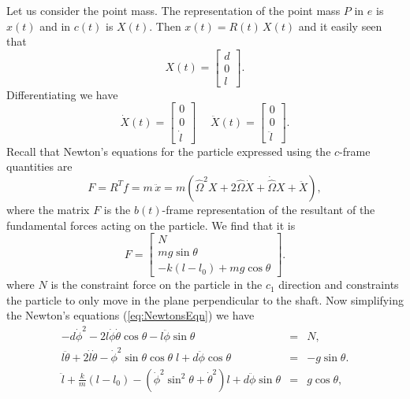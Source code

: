 \documentclass[graybox,envcountchap,sectrefs]{svmonoMuga}
\begin{document}
Let us consider the 
point mass.
The representation of the point mass $P$ in $e$ is $x(t)$ and in $c(t)$ is $X(t)$. Then $x(t)=R(t)\, X(t)$ and it easily seen that
\[
X(t)=\left[ \begin{array}{c}
d \\ 0 \\ l \end{array} \right].
\]
Differentiating we have
\[
\dot{X}(t)=\left[ \begin{array}{c}
0 \\
0 \\
\dot{l} \end{array} \right]\,\:\:\:\:\:
\ddot{X}(t)=\left[ \begin{array}{c}
0 \\
0 \\
\ddot{l} \end{array} \right].
\]
Recall that Newton's equations for the particle expressed using the $c$-frame quantities are
\begin{equation}\label{eq:NewtonsEqn}
F=R^T f=m\, \ddot{x}=m(\widehat{\Omega}^2X+2\widehat{\Omega}\dot{X}+\dot{\widehat{\Omega}}X+\ddot{X}),
\end{equation}
where the matrix $F$ is the $b(t)$-frame representation of the resultant of the fundamental forces acting on the particle. We find that it is
\[
F=\left[ \begin{array}{c}
N \\ mg\sin{\theta} \\ -k(l-l_0)+mg\cos{\theta}  \end{array} \right].
\]
where $N$ is the constraint force on the particle in the $c_1$ direction and constraints the particle to only move in the plane perpendicular to the shaft. Now simplifying the Newton's 
equations (\ref{eq:NewtonsEqn}) we have
\begin{eqnarray}
-d\dot{\phi}^2-2l\dot{\phi}\dot{\theta}\cos{\theta}-l\ddot{\phi}\sin{\theta}&=& N,\\
l\ddot{\theta} + 2 \dot{l}\dot{\theta}-\dot{\phi}^2\sin{\theta}\cos{\theta}\;l+ d\ddot{\phi} \cos{\theta} & = & -g \sin{\theta}.\label{eq:Govern2}\\
\ddot{l} + \frac{k}{m}(l-l_0)-(\dot{\phi}^2\sin^2{\theta}+\dot{\theta}^2) l+d\ddot{\phi} \sin{\theta}& = & g \cos{\theta}, \label{eq:Govern1}
\end{eqnarray}
\end{document}
